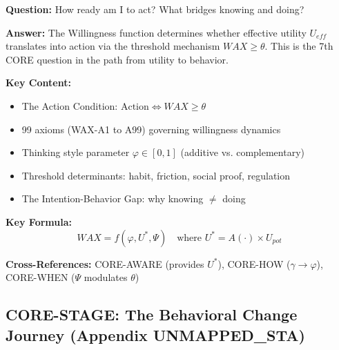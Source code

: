\begin{tcolorbox}[colback=gray!5!white, colframe=gray!75!black]
\textbf{Question:} How ready am I to act? What bridges knowing and doing?

\textbf{Answer:} The Willingness function determines whether effective utility
$U_{eff}$ translates into action via the threshold mechanism $WAX \geq \theta$.
This is the 7th CORE question in the path from utility to behavior.

\textbf{Key Content:}
\begin{itemize}[nosep]
\item The Action Condition: $\text{Action} \Leftrightarrow WAX \geq \theta$
\item 99 axioms (WAX-A1 to A99) governing willingness dynamics
\item Thinking style parameter $\varphi \in [0,1]$ (additive vs. complementary)
\item Threshold determinants: habit, friction, social proof, regulation
\item The Intention-Behavior Gap: why knowing $\neq$ doing
\end{itemize}

\textbf{Key Formula:}
\begin{equation}
WAX = f(\varphi, U^*, \Psi) \quad \text{where } U^* = A(\cdot) \times U_{pot}
\end{equation}

\textbf{Cross-References:} CORE-AWARE (provides $U^*$), CORE-HOW ($\gamma \to \varphi$), CORE-WHEN ($\Psi$ modulates $\theta$)
\end{tcolorbox}

\subsection{CORE-STAGE: The Behavioral Change Journey (Appendix UNMAPPED_STA)}

